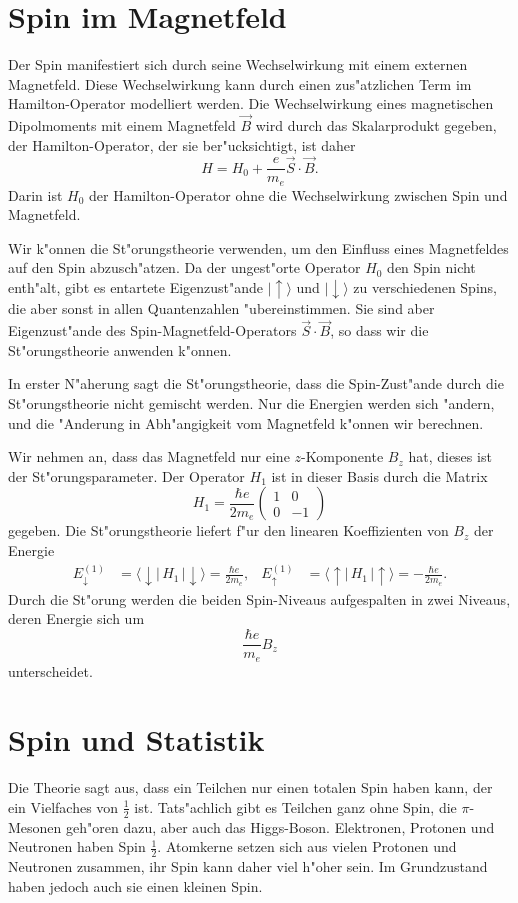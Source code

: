 \section{Spin im Magnetfeld}
Der Spin manifestiert sich durch seine Wechselwirkung mit einem
externen Magnetfeld.
Diese Wechselwirkung kann durch einen zus"atzlichen Term im
Hamilton-Operator modelliert werden.
Die Wechselwirkung eines magnetischen Dipolmoments mit einem
Magnetfeld $\vec B$ wird durch das Skalarprodukt gegeben,
der Hamilton-Operator, der sie ber"ucksichtigt, ist daher
%
\[
H=H_0 + \frac{e}{m_e}\vec S\cdot\vec B.
\]
Darin ist $H_0$ der Hamilton-Operator ohne die Wechselwirkung 
zwischen Spin und Magnetfeld.

Wir k"onnen die St"orungstheorie verwenden, um den Einfluss eines
Magnetfeldes auf den Spin abzusch"atzen.
Da der ungest"orte Operator $H_0$ den Spin nicht enth"alt, gibt
es entartete Eigenzust"ande
$|\uparrow\rangle$ und $|\downarrow\rangle$
zu verschiedenen Spins, die aber sonst in allen Quantenzahlen
"ubereinstimmen.
Sie sind aber Eigenzust"ande des Spin-Magnetfeld-Operators
$\vec S\cdot \vec B$, so dass wir die St"orungstheorie anwenden
k"onnen.

In erster N"aherung sagt die St"orungstheorie, dass die Spin-Zust"ande
durch die St"orungstheorie nicht gemischt werden.
Nur die Energien werden sich "andern, und die "Anderung in 
Abh"angigkeit vom Magnetfeld k"onnen wir berechnen.

Wir nehmen an, dass das Magnetfeld nur eine $z$-Komponente $B_z$ hat,
dieses ist der St"orungsparameter.
Der Operator $H_1$ ist in dieser Basis durch die Matrix
\[
H_1=
\frac{\hbar e}{2m_e}
\begin{pmatrix}
1&0\\
0&-1
\end{pmatrix}
\]
gegeben.
Die St"orungstheorie liefert f"ur den linearen Koeffizienten von $B_z$
der Energie
\begin{align*}
E_\downarrow^{(1)}
&=
\langle \downarrow|\, H_1 \,|\downarrow\rangle
=\frac{\hbar e}{2m_e},
&
E_\uparrow^{(1)}
&=
\langle \uparrow|\, H_1 \,|\uparrow\rangle
=-\frac{\hbar e}{2m_e}.
\end{align*}
Durch die St"orung werden die beiden Spin-Niveaus aufgespalten
in zwei Niveaus, deren Energie sich um
\[
\frac{\hbar e}{m_e}B_z
\]
unterscheidet.

\section{Spin und Statistik}
%
Die Theorie sagt aus, dass ein Teilchen nur einen totalen Spin haben kann,
der ein Vielfaches von $\frac12$ ist. Tats"achlich gibt es Teilchen
ganz ohne Spin, die $\pi$-Mesonen geh"oren dazu, aber auch das Higgs-Boson.
Elektronen, Protonen und Neutronen haben Spin $\frac12$. 
Atomkerne setzen sich aus vielen Protonen und Neutronen zusammen, ihr
Spin kann daher viel h"oher sein. Im Grundzustand haben jedoch auch
sie einen kleinen Spin.

